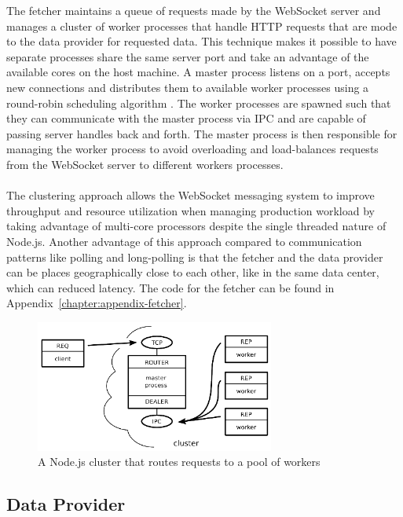 The fetcher maintains a queue of requests made by the WebSocket server and manages a cluster of worker processes that handle HTTP requests that are mode to the data provider for requested data. This technique makes it possible to have separate processes share the same server port and take an advantage of the available cores on the host machine. A master process listens on a port, accepts new connections and distributes them to available worker processes using a round-robin scheduling algorithm \cite{nodeCluster}. The worker processes are spawned such that they can communicate with the master process via IPC and are capable of passing server handles back and forth. The master process is then responsible for managing the worker process to avoid overloading and load-balances requests from the WebSocket server to different workers processes.
\\ \\
The clustering approach allows the WebSocket messaging system to improve throughput and resource utilization when managing production workload by taking advantage of multi-core processors despite the single threaded nature of Node.js. Another advantage of this approach compared to communication patterns like polling and long-polling is that the fetcher and the data provider can be places geographically close to each other, like in the same data center, which can reduced latency. The code for the fetcher can be found in Appendix~\ref{chapter:appendix-fetcher}.
\\
\begin{figure}[h!]
	\centering
	\label{fig:webSocketMessagingSystem}\includegraphics[width=0.7\textwidth]{images/poolOfWorkers}
	\caption{A Node.js cluster that routes requests to a pool of workers \cite{judd2008node}}
\end{figure}

\subsection{Data Provider}

